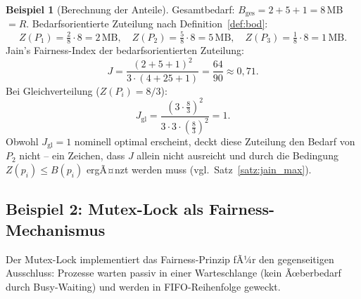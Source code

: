 ﻿\documentclass[a4paper,12pt]{article}
\theoremstyle{definition}
\newtheorem{beispiel}{Beispiel}
\begin{document}
\begin{beispiel}[Berechnung der Anteile]
Gesamtbedarf: $B_{\mathrm{ges}} = 2 + 5 + 1 = 8$\,MB $= R$.
Bedarfsorientierte Zuteilung nach Definition~\ref{def:bod}:
\[
  Z(P_1) = \tfrac{2}{8} \cdot 8 = 2\,\text{MB},\quad
  Z(P_2) = \tfrac{5}{8} \cdot 8 = 5\,\text{MB},\quad
  Z(P_3) = \tfrac{1}{8} \cdot 8 = 1\,\text{MB}.
\]
Jain's Fairness-Index der bedarfsorientierten Zuteilung:
\[
  J = \frac{(2+5+1)^2}{3 \cdot (4+25+1)} = \frac{64}{90} \approx 0{,}71.
\]
Bei Gleichverteilung ($Z(P_i) = 8/3$):
\[
  J_{\mathrm{gl}} = \frac{(3 \cdot \frac{8}{3})^2}{3 \cdot 3 \cdot (\frac{8}{3})^2}
  = 1.
\]
Obwohl $J_{\mathrm{gl}} = 1$ nominell optimal erscheint, deckt diese
Zuteilung den Bedarf von $P_2$ nicht -- ein Zeichen, dass $J$ allein
nicht ausreicht und durch die Bedingung $Z(p_i) \leq B(p_i)$
ergÃ¤nzt werden muss (vgl.\ Satz~\ref{satz:jain_max}).
\end{beispiel}

\subsection{Beispiel 2: Mutex-Lock als Fairness-Mechanismus}

Der Mutex-Lock implementiert das Fairness-Prinzip fÃ¼r den gegenseitigen
Ausschluss: Prozesse warten passiv in einer Warteschlange (kein Ãœberbedarf
durch Busy-Waiting) und werden in FIFO-Reihenfolge geweckt.
\end{document}
